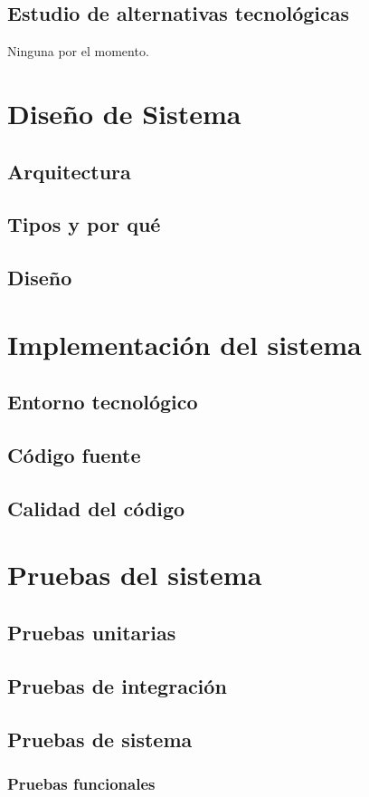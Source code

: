 \documentclass[12pt,letterpaper]{report}
\begin{document}
	\subsection{Estudio de alternativas tecnológicas}
		Ninguna por el momento.
\section{Diseño de Sistema}
	\subsection{Arquitectura}
	\subsection{Tipos y por qué}
	\subsection{Diseño}
\section{Implementación del sistema}
	\subsection{Entorno tecnológico}
	\subsection{Código fuente}
	\subsection{Calidad del código}
\section{Pruebas del sistema}
	\subsection{Pruebas unitarias}
	\subsection{Pruebas de integración}
	\subsection{Pruebas de sistema}
		\subsubsection{Pruebas funcionales}
\end{document}
